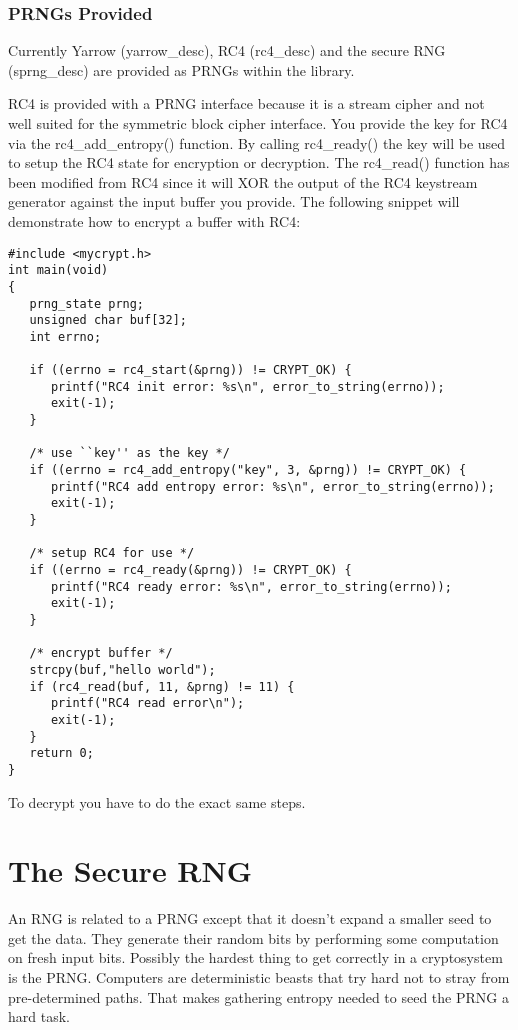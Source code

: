 \documentclass{book}
\begin{document}
\subsubsection{PRNGs Provided}
Currently Yarrow (yarrow\_desc), RC4 (rc4\_desc) and the secure RNG (sprng\_desc) are provided as PRNGs within the 
library.  

RC4 is provided with a PRNG interface because it is a stream cipher and not well suited for the symmetric block cipher
interface.  You provide the key for RC4 via the rc4\_add\_entropy() function.  By calling rc4\_ready() the key will be used
to setup the RC4 state for encryption or decryption.  The rc4\_read() function has been modified from RC4 since it will 
XOR the output of the RC4 keystream generator against the input buffer you provide.  The following snippet will demonstrate
how to encrypt a buffer with RC4:

\begin{small}
\begin{verbatim}
#include <mycrypt.h>
int main(void)
{
   prng_state prng;
   unsigned char buf[32];
   int errno;

   if ((errno = rc4_start(&prng)) != CRYPT_OK) {
      printf("RC4 init error: %s\n", error_to_string(errno));
      exit(-1);
   }

   /* use ``key'' as the key */
   if ((errno = rc4_add_entropy("key", 3, &prng)) != CRYPT_OK) {
      printf("RC4 add entropy error: %s\n", error_to_string(errno));
      exit(-1);
   }

   /* setup RC4 for use */
   if ((errno = rc4_ready(&prng)) != CRYPT_OK) {
      printf("RC4 ready error: %s\n", error_to_string(errno));
      exit(-1);
   }

   /* encrypt buffer */
   strcpy(buf,"hello world");
   if (rc4_read(buf, 11, &prng) != 11) {
      printf("RC4 read error\n");
      exit(-1);
   }
   return 0;
}   
\end{verbatim}
\end{small}
To decrypt you have to do the exact same steps.  

\section{The Secure RNG}
An RNG is related to a PRNG except that it doesn't expand a smaller seed to get the data.  They generate their random bits
by performing some computation on fresh input bits.  Possibly the hardest thing to get correctly in a cryptosystem is the 
PRNG.  Computers are deterministic beasts that try hard not to stray from pre-determined paths.  That makes gathering 
entropy needed to seed the PRNG a hard task.  
\end{document}
